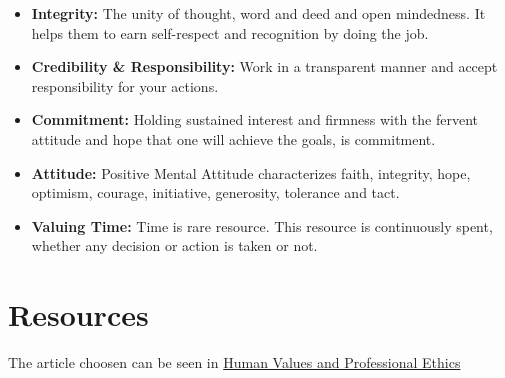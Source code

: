 \documentclass[12pt, a4papre]{article}
\begin{document}
	\begin{itemize}
		\item \textbf{Integrity:} The unity of thought, word and deed and open mindedness. It helps them to earn self-respect and recognition by doing the job.
		\item \textbf{Credibility \& Responsibility:} Work in a transparent manner and accept responsibility for your actions.
		\item \textbf{Commitment:} Holding sustained interest and firmness with the fervent attitude and hope that one will achieve the goals, is commitment.
		\item \textbf{Attitude:} Positive Mental Attitude characterizes faith, integrity, hope, optimism, courage, initiative, generosity, tolerance and tact.
		\item \textbf{Valuing Time:} Time is rare resource. This resource is continuously spent, whether any decision or action is taken or not.
	\end{itemize}
	
	\section{Resources}
	
	The article choosen can be seen in \href{https://eng.rizvi.edu.in/wp-content/uploads/2020/04/Handbook-Human-Values-and-Professional-Ethics.pdf}{Human Values and Professional Ethics}
\end{document}
